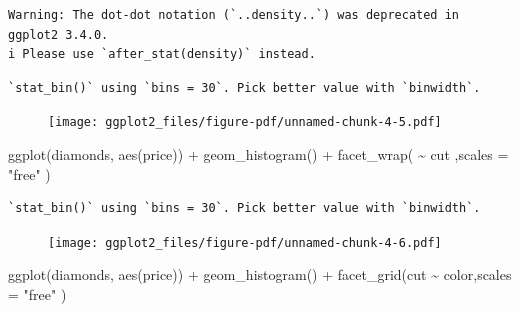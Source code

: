 \documentclass[
  letterpaper,
  DIV=11,
  numbers=noendperiod]{scrreprt}
\newenvironment{Shaded}{\begin{snugshade}}{\end{snugshade}}
\newcommand{\AttributeTok}[1]{\textcolor[rgb]{0.40,0.45,0.13}{#1}}
\newcommand{\FunctionTok}[1]{\textcolor[rgb]{0.28,0.35,0.67}{#1}}
\newcommand{\NormalTok}[1]{\textcolor[rgb]{0.00,0.23,0.31}{#1}}
\newcommand{\SpecialCharTok}[1]{\textcolor[rgb]{0.37,0.37,0.37}{#1}}
\newcommand{\StringTok}[1]{\textcolor[rgb]{0.13,0.47,0.30}{#1}}
\begin{document}
\begin{verbatim}
Warning: The dot-dot notation (`..density..`) was deprecated in ggplot2 3.4.0.
i Please use `after_stat(density)` instead.
\end{verbatim}

\begin{verbatim}
`stat_bin()` using `bins = 30`. Pick better value with `binwidth`.
\end{verbatim}

\begin{figure}[H]

{\centering \texttt{[image: ggplot2\_files/figure-pdf/unnamed-chunk-4-5.pdf]}

}

\end{figure}

\begin{Shaded}
\begin{Highlighting}[]
\FunctionTok{ggplot}\NormalTok{(diamonds, }\FunctionTok{aes}\NormalTok{(price)) }\SpecialCharTok{+}
  \FunctionTok{geom\_histogram}\NormalTok{() }\SpecialCharTok{+} 
  \FunctionTok{facet\_wrap}\NormalTok{( }\SpecialCharTok{\textasciitilde{}}\NormalTok{ cut ,}\AttributeTok{scales =} \StringTok{"free"}\NormalTok{ )}
\end{Highlighting}
\end{Shaded}

\begin{verbatim}
`stat_bin()` using `bins = 30`. Pick better value with `binwidth`.
\end{verbatim}

\begin{figure}[H]

{\centering \texttt{[image: ggplot2\_files/figure-pdf/unnamed-chunk-4-6.pdf]}

}

\end{figure}

\begin{Shaded}
\begin{Highlighting}[]
\FunctionTok{ggplot}\NormalTok{(diamonds, }\FunctionTok{aes}\NormalTok{(price)) }\SpecialCharTok{+}
  \FunctionTok{geom\_histogram}\NormalTok{() }\SpecialCharTok{+} 
  \FunctionTok{facet\_grid}\NormalTok{(cut }\SpecialCharTok{\textasciitilde{}}\NormalTok{ color,}\AttributeTok{scales =} \StringTok{"free"}\NormalTok{ )}
\end{Highlighting}
\end{Shaded}
\end{document}
